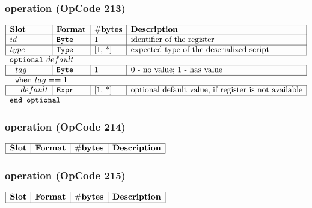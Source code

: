 \subsubsection{ operation (OpCode 213)}

\noindent
\(\begin{array}{| l | l | l | l |}
    \hline
    \bf{Slot} & \bf{Format} & \bf{\#bytes} & \bf{Description} \\
    \hline
         id & \lst{Byte} & \text{1} & \text{identifier of the register} \\
    \hline
           type & \lst{Type} & \text{[1, *]} & \text{expected type of the deserialized script} \\
    \hline
          \multicolumn{4}{l}{\lst{optional}~default} \\
    \hline
    ~~tag & \lst{Byte} & 1 & \text{0 - no value; 1 - has value} \\
    \hline
    \multicolumn{4}{l}{~~\lst{when}~tag == 1} \\
    \hline
             ~~~~ default & \lst{Expr} & \text{[1, *]} & \text{optional default value, if register is not available} \\
    \hline
          \multicolumn{4}{l}{\lst{end optional}} \\
\end{array}\)
       

\subsubsection{ operation (OpCode 214)}

\noindent
\(\begin{array}{| l | l | l | l |}
    \hline
    \bf{Slot} & \bf{Format} & \bf{\#bytes} & \bf{Description} \\
    \hline

\end{array}\)
       

\subsubsection{ operation (OpCode 215)}

\noindent
\(\begin{array}{| l | l | l | l |}
    \hline
    \bf{Slot} & \bf{Format} & \bf{\#bytes} & \bf{Description} \\
    \hline

\end{array}\)
       

